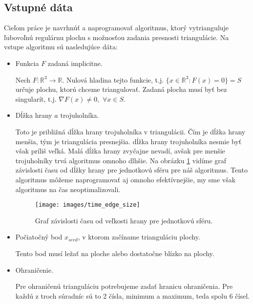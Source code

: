 \subsection{Vstupné dáta}
\label{kap:input_data}
Cieľom práce je navrhnúť a naprogramovať algoritmus, ktorý vytrianguluje ľubovoľnú regulárnu plochu s 
možnosťou zadania presnosti triangulácie. Na vstupe algoritmu sú nasledujúce dáta:
\begin{itemize}
    \item{
        Funkcia $F$ zadaná implicitne.
        
        Nech $F:\mathbb{R}^3 \to \mathbb{R}$.
        Nulová hladina tejto funkcie, t.j. $\{x \in \mathbb{R}^3 : F(x) = 0\} = S$ určuje plochu, 
        ktorú chceme triangulovať. 
        Zadaná plocha musí byť bez singularít, t.j. $\nabla F(x) \neq 0, \,\, \forall x \in S.$
    }
    \item{
        Dĺžka hrany $a$ trojuholníka.

        Toto je približná dĺžka hrany trojuholníka v triangulácii. 
        Čím je dĺžka hrany menšia, tým je triangulácia presnejšia. dĺžka hrany trojuholníka 
        nesmie byť však príliš veľká. Malá dĺžka hrany zvyčajne nevadí, avšak pre 
        menšie trojuholníky trvá algoritmus omnoho dlhšie. Na obrázku \ref{obr:time_edge_size}
        vidíme graf závislosti času od dĺžky hrany pre jednotkovú sféru pre náš algoritmus. 
        Tento algoritmus môžeme
        naprogramovať aj omnoho efektívnejšie, my sme však algoritmus na čas neoptimalizovali.

        \begin{figure}
            \centerline{\texttt{[image: images/time\_edge\_size]}}
            \caption[Graf závislosti času od veľkosti hrany]{Graf závislosti času od veľkosti hrany pre jednotkovú sféru.}
            \label{obr:time_edge_size}
        \end{figure}
    }
    \item{
        Počiatočný bod $x_{seed}$, v ktorom začíname trianguláciu plochy. 

        Tento bod musí ležať na ploche alebo dostatočne blízko na plochy.
    }
    \item{
        Ohraničenie.

        Pre ohraničenú trianguláciu potrebujeme zadať hranicu ohraničenia. Pre každú z troch súradníc 
        sú to 2 čísla, minimum a maximum, teda spolu 6 čísel.
    }
\end{itemize}

